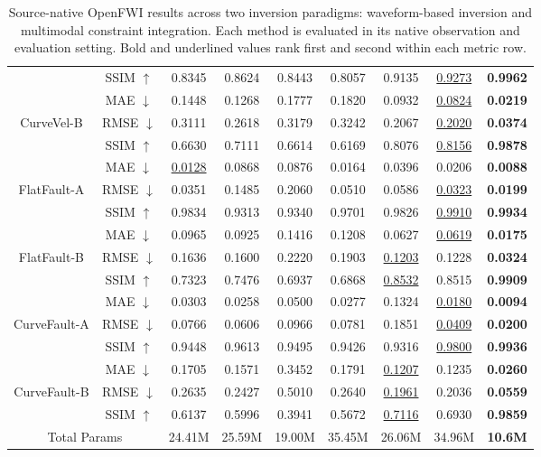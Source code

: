 \begin{table}[t]
\begin{adjustwidth}{0cm}{0cm}
{\begin{tabular}{@{}c c c c c c c c c@{}}
		& SSIM $\uparrow$ & 0.8345 & 0.8624 & 0.8443 & 0.8057 & 0.9135 & \underline{0.9273} & \textbf{0.9962} \\
		\addlinespace[2pt]
		& MAE $\downarrow$ & 0.1448 & 0.1268 & 0.1777 & 0.1820 & 0.0932 & \underline{0.0824} & \textbf{0.0219} \\
		CurveVel-B & RMSE $\downarrow$ & 0.3111 & 0.2618 & 0.3179 & 0.3242 & 0.2067 & \underline{0.2020} & \textbf{0.0374} \\
		& SSIM $\uparrow$ & 0.6630 & 0.7111 & 0.6614 & 0.6169 & 0.8076 & \underline{0.8156} & \textbf{0.9878} \\
		\midrule
		& MAE $\downarrow$ & \underline{0.0128} & 0.0868 & 0.0876 & 0.0164 & 0.0396 & 0.0206 & \textbf{0.0088} \\
		FlatFault-A & RMSE $\downarrow$ & 0.0351 & 0.1485 & 0.2060 & 0.0510 & 0.0586 & \underline{0.0323} & \textbf{0.0199} \\
		& SSIM $\uparrow$ & 0.9834 & 0.9313 & 0.9340 & 0.9701 & 0.9826 & \underline{0.9910} & \textbf{0.9934} \\
		\addlinespace[2pt]
		& MAE $\downarrow$ & 0.0965 & 0.0925 & 0.1416 & 0.1208 & 0.0627 & \underline{0.0619} & \textbf{0.0175} \\
		FlatFault-B & RMSE $\downarrow$ & 0.1636 & 0.1600 & 0.2220 & 0.1903 & \underline{0.1203} & 0.1228 & \textbf{0.0324} \\
		& SSIM $\uparrow$ & 0.7323 & 0.7476 & 0.6937 & 0.6868 & \underline{0.8532} & 0.8515 & \textbf{0.9909} \\
		\midrule
		& MAE $\downarrow$ & 0.0303 & 0.0258 & 0.0500 & 0.0277 & 0.1324 & \underline{0.0180} & \textbf{0.0094} \\
		CurveFault-A & RMSE $\downarrow$ & 0.0766 & 0.0606 & 0.0966 & 0.0781 & 0.1851 & \underline{0.0409} & \textbf{0.0200} \\
		& SSIM $\uparrow$ & 0.9448 & 0.9613 & 0.9495 & 0.9426 & 0.9316 & \underline{0.9800} & \textbf{0.9936} \\
		\addlinespace[2pt]
		& MAE $\downarrow$ & 0.1705 & 0.1571 & 0.3452 & 0.1791 & \underline{0.1207} & 0.1235 & \textbf{0.0260} \\
		CurveFault-B & RMSE $\downarrow$ & 0.2635 & 0.2427 & 0.5010 & 0.2640 & \underline{0.1961} & 0.2036 & \textbf{0.0559} \\
		& SSIM $\uparrow$ & 0.6137 & 0.5996 & 0.3941 & 0.5672 & \underline{0.7116} & 0.6930 & \textbf{0.9859} \\
		\midrule
		\multicolumn{2}{c}{Total Params} & 24.41M & 25.59M & 19.00M & 35.45M & 26.06M & 34.96M & \textbf{10.6M} \\
		\bottomrule
	\end{tabular}%
}
	\caption{Source-native OpenFWI results across two inversion paradigms: waveform-based inversion and multimodal constraint integration. Each method is evaluated in its native observation and evaluation setting. Bold and underlined values rank first and second within each metric row.}
	\label{tab:main-comparison}

\end{adjustwidth}
\end{table}

